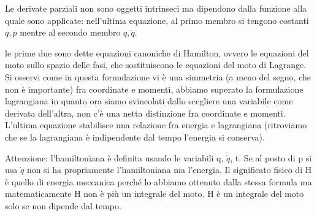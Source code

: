 \documentclass[
10pt, %
a4paper, %
oneside, %
headinclude,footinclude, %
BCOR5mm, %
]{scrartcl}
\begin{document}
\begin{osservazione}
	Le derivate parziali non sono oggetti intrinseci ma dipendono dalla funzione alla quale sono applicate: nell'ultima equazione, al primo membro si tengono costanti \(q, p\) mentre al secondo membro \(q, \dot{q}\).
\end{osservazione}
le prime due sono dette equazioni canoniche di Hamilton, ovvero le equazioni del moto sullo spazio delle fasi, che sostituiscono le equazioni del moto di Lagrange. Si osservi come in questa formulazione vi è una simmetria (a meno del segno, che non è importante) fra coordinate e momenti, abbiamo superato la formulazione lagrangiana in quanto ora siamo svincolati dallo scegliere una variabile come derivata dell'altra, non c'è una netta distinzione fra coordinate e momenti. L'ultima equazione stabilisce una relazione fra energia e lagrangiana (ritroviamo che se la lagrangiana è indipendente dal tempo l'energia si conserva).
\begin{osservazione}
	Attenzione: l'hamiltoniana è definita usando le variabili q, $\dot{q}$, t. Se al posto di p si usa $\dot{q}$ non si ha propriamente l'hamiltoniana ma l'energia. Il significato fisico di H è quello di energia meccanica perché lo abbiamo ottenuto dalla stessa formula ma matematicamente H non è più un integrale del moto. H è un integrale del moto solo se non dipende dal tempo.
\end{osservazione}
\end{document}
